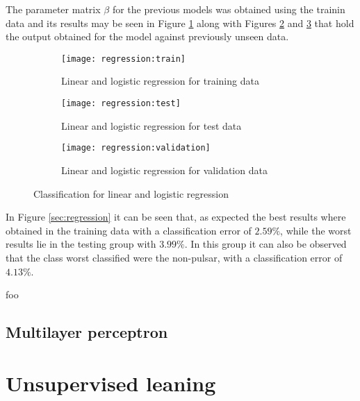 \documentclass[journal]{IEEEtran}
\begin{document}
The parameter matrix $\beta$ for the previous models was obtained using the
trainin data and its results may be seen in Figure \ref{fig:regression:train}
along with Figures \ref{fig:regression:test} and \ref{fig:regression:validation}
that hold the output obtained for the model against previously unseen data.

\begin{figure}[ht]
    \begin{subfigure}[b]{\linewidth}
        \texttt{[image: regression:train]}
        \caption{Linear and logistic regression for training data
        \label{fig:regression:train}}
    \end{subfigure}
    \begin{subfigure}[b]{\linewidth}
        \texttt{[image: regression:test]}
        \caption{Linear and logistic regression for test data
        \label{fig:regression:test}}
    \end{subfigure}
    \begin{subfigure}[b]{\linewidth}
        \texttt{[image: regression:validation]}
        \caption{Linear and logistic regression for validation data
        \label{fig:regression:validation}}
    \end{subfigure}
    \caption{Classification for linear and logistic regression
        \label{fig:regression}}
\end{figure}

In Figure \ref{sec:regression} it can be seen that, as expected the best results
where obtained in the training data with a classification error of $2.59\%$,
while the worst results lie in the testing group with $3.99\%$. In this group it
can also be observed that the class worst classified were the non-pulsar, with
a classification error of $4.13\%$.

\begin{table}
    \caption{foo}
\end{table}


\subsection{Multilayer perceptron\label{sec:nn}}

\section{Unsupervised leaning\label{sec:unsupervised}}
\printbibliography
\end{document}
